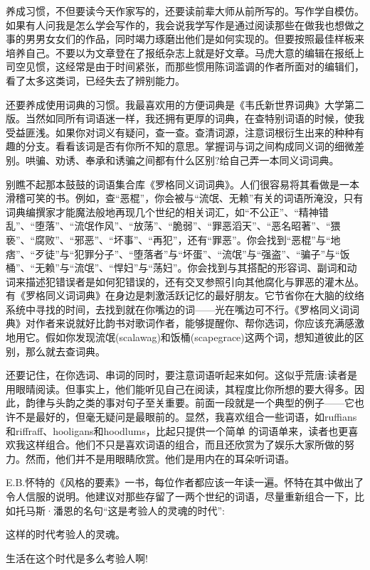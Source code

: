 养成习惯，不但要读今天作家写的，还要读前辈大师从前所写的。写作学自模仿。如果有人问我是怎么学会写作的，我会说我学写作是通过阅读那些在做我也想做之事的男男女女们的作品，同时竭力琢磨出他们是如何实现的。但要按照最佳样板来培养自己。不要以为文章登在了报纸杂志上就是好文章。马虎大意的编辑在报纸上司空见惯，这经常是由于时间紧张，而那些惯用陈词滥调的作者所面对的编辑们，看了太多这类词，已经失去了辨别能力。

还要养成使用词典的习惯。我最喜欢用的方便词典是《韦氏新世界词典》大学第二版。当然如同所有词语迷一样，我还拥有更厚的词典，在查特别词语的时候，使我受益匪浅。如果你对词义有疑问，查一查。查清词源，注意词根衍生出来的种种有趣的分支。看看该词是否有你所不知的意思。掌握词与词之间构成同义词的细微差别。哄骗、劝诱、奉承和诱骗之间都有什么区别?给自己弄一本同义词词典。

别瞧不起那本鼓鼓的词语集合库《罗格同义词词典》。人们很容易将其看做是一本滑稽可笑的书。例如，查“恶棍”，你会被与“流氓、无赖”有关的词语所淹没，只有词典编撰家才能魔法般地再现几个世纪的相关词汇，如“不公正”、“精神错乱”、“堕落”、“流氓作风”、“放荡”、“脆弱”、“罪恶滔天”、“恶名昭著”、“猥亵”、“腐败”、“邪恶”、“坏事”、“再犯”，还有“罪恶”。你会找到“恶棍”与“地痞”、“歹徒”与“犯罪分子”、“堕落者”与“坏蛋”、“流氓”与“强盗”、“骗子”与“饭桶”、“无赖”与“流氓”、“悍妇”与“荡妇”。你会找到与其搭配的形容词、副词和动词来描述犯错误者是如何犯错误的，还有交叉参照引向其他腐化与罪恶的灌木丛。有《罗格同义词词典》在身边是刺激活跃记忆的最好朋友。它节省你在大脑的纹络系统中寻找的时间，去找到就在你嘴边的词——光在嘴边可不行。《罗格同义词词典》对作者来说就好比韵书对歌词作者，能够提醒你、帮你选词，你应该充满感激地用它。假如你发现流氓(scalawag)和饭桶(scapegrace)这两个词，想知道彼此的区别，那么就去查词典。

还要记住，在你选词、串词的同时，要注意词语听起来如何。这似乎荒唐:读者是用眼晴阅读。但事实上，他们能听见自己在阅读，其程度比你所想的要大得多。因此，韵律与头韵之类的事对句子至关重要。前面一段就是一个典型的例子——它也许不是最好的，但毫无疑问是最眼前的。显然，我喜欢组合一些词语，如ruffians和riffraff、hooligans和hoodlums，比起只提供一个简单 的词语单来，读者也更喜欢我这样组合。他们不只是喜欢词语的组合，而且还欣赏为了娱乐大家所做的努力。然而，他们并不是用眼睛欣赏。他们是用内在的耳朵听词语。

E.B.怀特的《风格的要素》一书，每位作者都应该一年读一遍。怀特在其中做出了令人信服的说明。他建议对那些存留了一两个世纪的词语，尽量重新组合一下，比如托马斯·潘恩的名句“这是考验人的灵魂的时代”:

这样的时代考验人的灵魂。

生活在这个时代是多么考验人啊!

